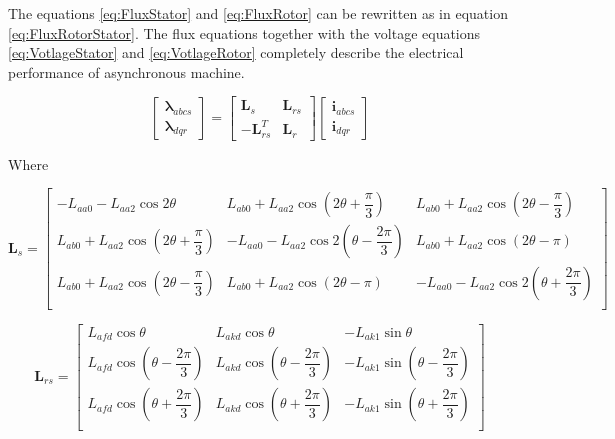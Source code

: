 The equations \ref{eq:FluxStator} and \ref{eq:FluxRotor} can be rewritten as in equation \ref{eq:FluxRotorStator}. The flux equations together with the voltage equations \ref{eq:VotlageStator} and \ref{eq:VotlageRotor} completely describe the electrical performance of asynchronous machine.

\begin{equation} \label{eq:FluxRotorStator}
	\begin{bmatrix}
		\boldsymbol{\lambda}_{abcs} \\
		\boldsymbol{\lambda}_{dqr}
	\end{bmatrix}
	=
	\begin{bmatrix}
		\mathbf{L}_s & \mathbf{L}_{rs} \\
		-\mathbf{L}_{rs}^{T} & \mathbf{L}_r
	\end{bmatrix}
	\begin{bmatrix}
		\mathbf{i}_{abcs} \\
		\mathbf{i}_{dqr}
	\end{bmatrix}
\end{equation}

Where

\begin{equation}
	\mathbf{L}_s
	=
	\begin{bmatrix}
		-L_{aa0} - L_{aa2} \cos 2 \theta &
		L_{ab0} + L_{aa2} \cos (2 \theta + \dfrac{\pi}{3}) &
		L_{ab0} + L_{aa2}\cos (2 \theta - \dfrac{\pi}{3}) \\[6pt]
		L_{ab0} + L_{aa2} \cos (2 \theta + \dfrac{\pi}{3}) &
		-L_{aa0} - L_{aa2} \cos 2(\theta - \dfrac{2 \pi}{3})&
		L_{ab0} + L_{aa2}\cos (2 \theta - \pi) \\[6pt]
		L_{ab0} + L_{aa2} \cos (2 \theta - \dfrac{\pi}{3}) &
		L_{ab0} + L_{aa2} \cos (2 \theta - \pi)&
		-L_{aa0} - L_{aa2}\cos 2(\theta + \dfrac{2 \pi}{3}) \\[6pt]
	\end{bmatrix}
\end{equation}

\begin{equation}
	\mathbf{L}_{rs}
	=
	\begin{bmatrix}
		L_{afd} \cos \theta &
		L_{akd} \cos \theta &
		-L_{ak1} \sin \theta \\[6pt]
		L_{afd} \cos (\theta - \dfrac{2 \pi}{3}) &
		L_{akd} \cos (\theta - \dfrac{2 \pi}{3}) &
		-L_{ak1} \sin (\theta - \dfrac{2 \pi}{3}) \\[6pt]
		L_{afd} \cos (\theta + \dfrac{2 \pi}{3}) &
		L_{akd} \cos (\theta + \dfrac{2 \pi}{3}) &
		-L_{ak1} \sin (\theta + \dfrac{2 \pi}{3}) \\[6pt]
	\end{bmatrix}
\end{equation}

